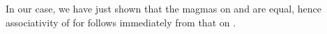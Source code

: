 \documentclass[../Main.tex]{subfiles}
\begin{document}
In our case, we have just shown that the \AgdaFunction{\_+\_} magmas on  and  are equal, hence associativity of \AgdaFunction{\_+\_} for  follows immediately from that on .
\begin{code}%
\>[0]\<%
\\
\>[0]\<%
\end{code}
\end{document}

